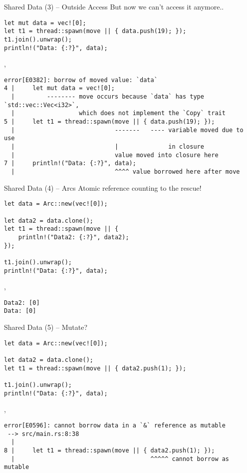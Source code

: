\begin{frame}[fragile]{Shared Data (3) -- Outside Access}
But now we can't access it anymore..
\begin{verbatim}
let mut data = vec![0];
let t1 = thread::spawn(move || { data.push(19); });
t1.join().unwrap();
println!("Data: {:?}", data);
\end{verbatim}
\sep
\begin{verbatim}
error[E0382]: borrow of moved value: `data`
4 |     let mut data = vec![0];
  |         -------- move occurs because `data` has type `std::vec::Vec<i32>`,
  |                  which does not implement the `Copy` trait
5 |     let t1 = thread::spawn(move || { data.push(19); });
  |                            -------   ---- variable moved due to use
  |                            |              in closure
  |                            value moved into closure here
7 |     println!("Data: {:?}", data);
  |                            ^^^^ value borrowed here after move
\end{verbatim}
\end{frame}

\begin{frame}[fragile]{Shared Data (4) -- Arcs}
Atomic reference counting to the rescue!
\begin{verbatim}
let data = Arc::new(vec![0]);

let data2 = data.clone();
let t1 = thread::spawn(move || {
    println!("Data2: {:?}", data2);
});

t1.join().unwrap();
println!("Data: {:?}", data);
\end{verbatim}
\sep
\begin{verbatim}
Data2: [0]
Data: [0]
\end{verbatim}
\end{frame}

\begin{frame}[fragile]{Shared Data (5) -- Mutate?}
\begin{verbatim}
let data = Arc::new(vec![0]);

let data2 = data.clone();
let t1 = thread::spawn(move || { data2.push(1); });

t1.join().unwrap();
println!("Data: {:?}", data);
\end{verbatim}
\sep
\begin{verbatim}
error[E0596]: cannot borrow data in a `&` reference as mutable
 --> src/main.rs:8:38
  |
8 |     let t1 = thread::spawn(move || { data2.push(1); });
  |                                      ^^^^^ cannot borrow as mutable
\end{verbatim}
\end{frame}

